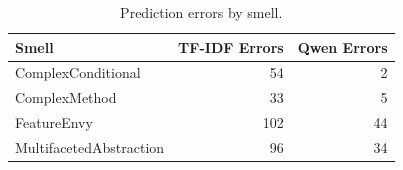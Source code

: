 \begin{table}[H]
\centering
\begin{tabular}{lrr}
\toprule
Smell & TF-IDF Errors & Qwen Errors \\
\midrule
ComplexConditional & 54 & 2 \\
ComplexMethod & 33 & 5 \\
FeatureEnvy & 102 & 44 \\
MultifacetedAbstraction & 96 & 34 \\
\bottomrule
\end{tabular}
\caption{Prediction errors by smell.}
\label{tab:error-by-smell}
\end{table}
